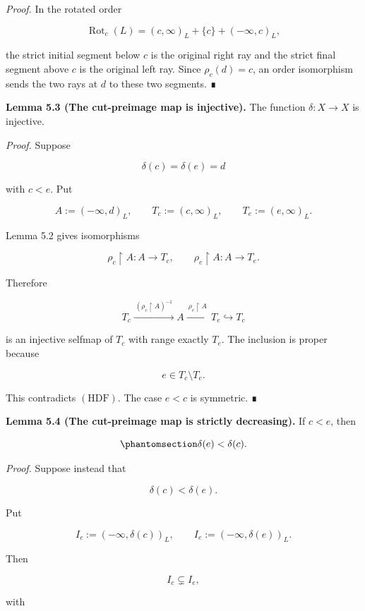\documentclass[
  english,
  11pt,
  reqno]{amsart}
\begin{document}
\emph{Proof.} In the rotated order

\[
\operatorname{Rot}_c(L)
=
(c,\infty)_L+\{c\}+(-\infty,c)_L,
\]

the strict initial segment below \(c\) is the original right ray and the
strict final segment above \(c\) is the original left ray. Since
\(\rho_c(d)=c\), an order isomorphism sends the two rays at \(d\) to
these two segments. ∎

\protect{}\label{lem:5-3-delta-injective}

\textbf{Lemma 5.3 (The cut-preimage map is injective).} The function
\(\delta:X\to X\) is injective.

\emph{Proof.} Suppose

\[
\delta(c)=\delta(e)=d
\]

with \(c<e\). Put

\[
A:=(-\infty,d)_L,
\qquad
T_c:=(c,\infty)_L,
\qquad
T_e:=(e,\infty)_L.
\]

Lemma 5.2 gives isomorphisms

\[
\rho_c\upharpoonright A:A\to T_c,
\qquad
\rho_e\upharpoonright A:A\to T_e.
\]

Therefore

\[
T_c
\xrightarrow{\ (\rho_c\upharpoonright A)^{-1}\ }
A
\xrightarrow{\ \rho_e\upharpoonright A\ }
T_e
\hookrightarrow
T_c
\]

is an injective selfmap of \(T_c\) with range exactly \(T_e\). The
inclusion is proper because

\[
e\in T_c\setminus T_e.
\]

This contradicts \((\mathrm{HDF})\). The case \(e<c\) is symmetric. ∎

\protect{}\label{lem:5-4-delta-decreasing}

\textbf{Lemma 5.4 (The cut-preimage map is strictly decreasing).} If
\(c<e\), then

\begin{equation}\protect\phantomsection\label{eq:delta-decreasing}{
\delta(e)<\delta(c).
}\end{equation}

\emph{Proof.} Suppose instead that

\[
\delta(c)<\delta(e).
\]

Put

\[
I_c:=(-\infty,\delta(c))_L,
\qquad
I_e:=(-\infty,\delta(e))_L.
\]

Then

\[
I_c\subsetneq I_e,
\]

with
\end{document}

